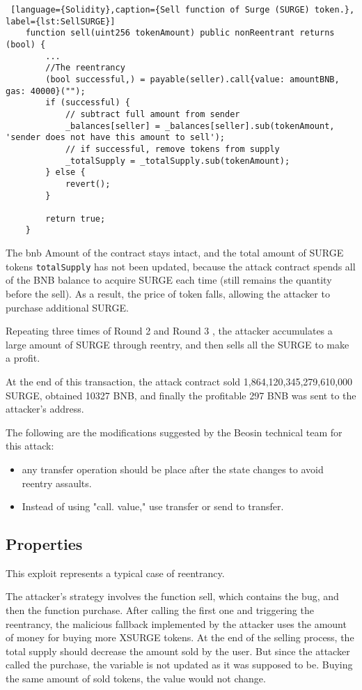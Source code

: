 \begin{lstlisting} [language={Solidity},caption={Sell function of Surge (SURGE) token.}, label={lst:SellSURGE}]
    function sell(uint256 tokenAmount) public nonReentrant returns (bool) {
        ...
        //The reentrancy 
        (bool successful,) = payable(seller).call{value: amountBNB, gas: 40000}(""); 
        if (successful) {
            // subtract full amount from sender
            _balances[seller] = _balances[seller].sub(tokenAmount, 'sender does not have this amount to sell');
            // if successful, remove tokens from supply
            _totalSupply = _totalSupply.sub(tokenAmount);
        } else {
            revert();
        }
        
        return true;
    }
\end{lstlisting}


The bnb Amount of the contract stays intact, and the total amount of SURGE tokens \texttt{totalSupply}  
has not been updated, because the attack contract spends all of the BNB balance to acquire SURGE
 each time (still remains the quantity before the sell).
As a result, the price of token falls, allowing the attacker to purchase additional SURGE. 

Repeating three times of Round 2 and Round 3 , the attacker accumulates a large amount of SURGE through reentry, and then sells all the SURGE to make a profit.

At the end of this transaction, the attack contract sold 1,864,120,345,279,610,000 SURGE, 
obtained 10327 BNB, and finally the profitable 297 BNB was sent to the attacker's address.

The following are the modifications suggested by the Beosin technical team for this attack:
\begin{itemize}
    \item any transfer operation should be place after the state changes to avoid reentry assaults.
    \item Instead of using "call. value," use transfer or send to transfer. 
\end{itemize}

\subsection{Properties}

This exploit represents a typical case of reentrancy. 

The attacker's strategy involves the function sell, which contains the bug, and then the function purchase. 
After calling the first one and triggering the reentrancy, the malicious fallback implemented by the attacker uses the amount of money for buying more XSURGE tokens. 
At the end of the selling process, the total supply should decrease the amount sold by the user.
But since the attacker called the purchase, the variable is not updated as it was supposed to be. 
Buying the same amount of sold tokens, the value would not change.

